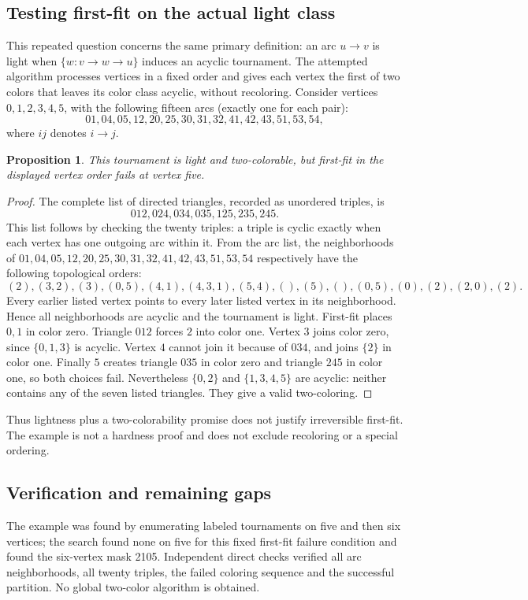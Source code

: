 \documentclass[11pt]{article}
\newtheorem{proposition}{Proposition}
\begin{document}
\subsection{Testing first-fit on the actual light class}
This repeated question concerns the same primary definition: an arc $u\to v$ is light when $\{w:v\to w\to u\}$ induces an acyclic tournament. The attempted algorithm processes vertices in a fixed order and gives each vertex the first of two colors that leaves its color class acyclic, without recoloring.
Consider vertices $0,1,2,3,4,5$, with the following fifteen arcs (exactly one for each pair):
\[
01,04,05,12,20,25,30,31,32,41,42,43,51,53,54,
\]
where $ij$ denotes $i\to j$.
\begin{proposition}
This tournament is light and two-colorable, but first-fit in the displayed vertex order fails at vertex five.
\end{proposition}
\begin{proof}
The complete list of directed triangles, recorded as unordered triples, is
\[
012,024,034,035,125,235,245.
\]
This list follows by checking the twenty triples: a triple is cyclic exactly when each vertex has one outgoing arc within it. From the arc list, the neighborhoods of $01,04,05,12,20,25,30,31,32,41,42,43,51,53,54$ respectively have the following topological orders:
\[
(2),(3,2),(3),(0,5),(4,1),(4,3,1),(5,4),(),(5),(),(0,5),(0),(2),(2,0),(2).
\]
Every earlier listed vertex points to every later listed vertex in its neighborhood. Hence all neighborhoods are acyclic and the tournament is light.
First-fit places $0,1$ in color zero. Triangle $012$ forces $2$ into color one. Vertex $3$ joins color zero, since $\{0,1,3\}$ is acyclic. Vertex $4$ cannot join it because of $034$, and joins $\{2\}$ in color one. Finally $5$ creates triangle $035$ in color zero and triangle $245$ in color one, so both choices fail. Nevertheless $\{0,2\}$ and $\{1,3,4,5\}$ are acyclic: neither contains any of the seven listed triangles. They give a valid two-coloring.
\end{proof}
Thus lightness plus a two-colorability promise does not justify irreversible first-fit. The example is not a hardness proof and does not exclude recoloring or a special ordering.
\subsection{Verification and remaining gaps}
The example was found by enumerating labeled tournaments on five and then six vertices; the search found none on five for this fixed first-fit failure condition and found the six-vertex mask 2105. Independent direct checks verified all arc neighborhoods, all twenty triples, the failed coloring sequence and the successful partition. No global two-color algorithm is obtained.
\end{document}
